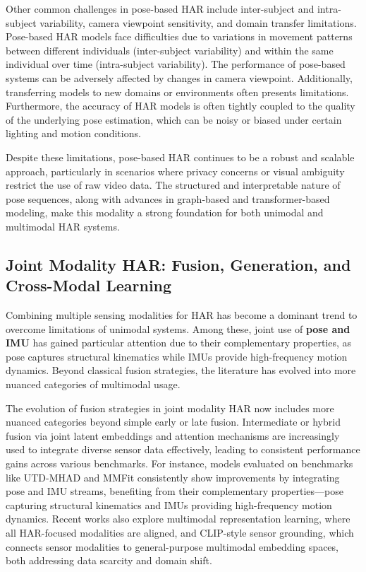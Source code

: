 Other common challenges in pose-based HAR include inter-subject and intra-subject variability, camera viewpoint sensitivity, and domain transfer limitations. Pose-based HAR models face difficulties due to variations in movement patterns between different individuals (inter-subject variability) and within the same individual over time (intra-subject variability). The performance of pose-based systems can be adversely affected by changes in camera viewpoint. Additionally, transferring models to new domains or environments often presents limitations. Furthermore, the accuracy of HAR models is often tightly coupled to the quality of the underlying pose estimation, which can be noisy or biased under certain lighting and motion conditions.

Despite these limitations, pose-based HAR continues to be a robust and scalable approach, particularly in scenarios where privacy concerns or visual ambiguity restrict the use of raw video data. The structured and interpretable nature of pose sequences, along with advances in graph-based and transformer-based modeling, make this modality a strong foundation for both unimodal and multimodal HAR systems.

\subsection{Joint Modality HAR: Fusion, Generation, and Cross-Modal Learning}

Combining multiple sensing modalities for HAR has become a dominant trend to overcome limitations of unimodal systems. Among these, joint use of \textbf{pose and IMU} has gained particular attention due to their complementary properties, as pose captures structural kinematics while IMUs provide high-frequency motion dynamics. Beyond classical fusion strategies, the literature has evolved into more nuanced categories of multimodal usage. 

The evolution of fusion strategies in joint modality HAR now includes more nuanced categories beyond simple early or late fusion. Intermediate or hybrid fusion via joint latent embeddings and attention mechanisms are increasingly used to integrate diverse sensor data effectively, leading to consistent performance gains across various benchmarks. For instance, models evaluated on benchmarks like UTD-MHAD and MMFit consistently show improvements by integrating pose and IMU streams, benefiting from their complementary properties—pose capturing structural kinematics and IMUs providing high-frequency motion dynamics. Recent works also explore multimodal representation learning, where all HAR-focused modalities are aligned, and CLIP-style sensor grounding, which connects sensor modalities to general-purpose multimodal embedding spaces, both addressing data scarcity and domain shift.

